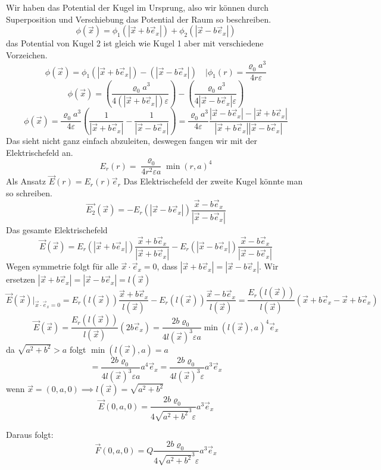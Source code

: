 \documentclass{scrartcl}
\let\*\cdot
\begin{document}
\begin{itemize}
Wir haben das Potential der Kugel im Ursprung, also wir können durch Superposition und Verschiebung das Potential der Raum so beschreiben.
\[\phi(\vec{x})=\phi_1(|\vec{x}+b \vec{e}_x|)+\phi_2(|\vec{x}-b \vec{e}_x|)\]
das Potential von Kugel 2 ist gleich wie Kugel 1 aber mit verschiedene Vorzeichen.
\[\phi(\vec{x})=\phi_1(|\vec{x}+b \vec{e}_x|)-(|\vec{x}-b \vec{e}_x|)\quad | \phi_1(r)=\frac{\varrho_0 a^3}{4 r \varepsilon}\]
\[\phi(\vec{x})=\left(\frac{\varrho_0 a^3}{4 (|\vec{x}+b \vec{e}_x|)\varepsilon}\right)-\left(\frac{\varrho_0 a^3}{4|\vec{x}-b \vec{e}_x| \varepsilon}\right)\]
\[\phi(\vec{x})=\frac{\varrho_0 a^3}{4\varepsilon}\left(\frac{1}{ |\vec{x}+b \vec{e}_x|}-\frac{1}{|\vec{x}-b \vec{e}_x|}\right)
=\frac{\varrho_0 a^3}{4\varepsilon}\frac{|\vec{x}-b \vec{e}_x|- |\vec{x}+b \vec{e}_x|}{ |\vec{x}+b \vec{e}_x| |\vec{x}-b \vec{e}_x|}\]
Das sieht nicht ganz einfach abzuleiten, deswegen fangen wir mit der Elektrischefeld an.
\[ E_r(r)  =\frac{\varrho_0}{4 r^2 \varepsilon a} {\min(r,a)}^4 \]
Als Ansatz $\vec{E}(r)=E_r(r)\vec{e}_r$
Das Elektrischefeld der zweite Kugel könnte man so schreiben.
\[ \vec{E_2}(\vec{x})  =-E_r(|\vec{x}-b\vec{e}_x|)\frac{\vec{x}-b\vec{e}_x}{|\vec{x}-b\vec{e}_x|}\]
Das gesamte Elektrischefeld
\[ \vec{E}(\vec{x})  =E_r(|\vec{x}+b\vec{e}_x|)\frac{\vec{x}+b\vec{e}_x}{|\vec{x}+b\vec{e}_x|}-E_r(|\vec{x}-b\vec{e}_x|)\frac{\vec{x}-b\vec{e}_x}{|\vec{x}-b\vec{e}_x|}\]
Wegen symmetrie folgt für alle $\vec{x}\*\vec{e}_x= 0$, dass $|\vec{x}+b \vec{e}_x|=|\vec{x}-b \vec{e}_x|$.
Wir ersetzen  $|\vec{x}+b \vec{e}_x|=|\vec{x}-b \vec{e}_x|=l(\vec{x})$
\[ \vec{E}(\vec{x})|_{\vec{x}\*\vec{e}_x= 0}  =E_r(l(\vec{x}))\frac{\vec{x}+b\vec{e}_x}{l(\vec{x})}-E_r(l(\vec{x}))\frac{\vec{x}-b\vec{e}_x}{l(\vec{x})}
=\frac{E_r(l(\vec{x}))}{l(\vec{x})}
\left(\vec{x}+b\vec{e}_x-\vec{x}+b\vec{e}_x\right)\]
\[ \vec{E}(\vec{x}) =\frac{E_r(l(\vec{x}))}{l(\vec{x})}
\left(2b\vec{e}_x\right)
=\frac{2b \varrho_0}{4 {l(\vec{x})}^3 \varepsilon a} {\min(l(\vec{x}),a)}^4\vec{e}_x\]
da $\sqrt{a^2+b^2}>a$ folgt $\min(l(\vec{x}),a)=a$
\[=\frac{2b \varrho_0}{4 {l(\vec{x})}^3 \varepsilon a} a^4\vec{e}_x
=\frac{2b \varrho_0}{4 {l(\vec{x})}^3 \varepsilon } a^3 \vec{e}_x\]
wenn $\vec{x}=(0,a,0)\implies l(\vec{x})=\sqrt{a^2+b^2}$
\[ \vec{E}(0,a,0) 
=\frac{2b \varrho_0}{4 {\sqrt{a^2+b^2}}^3 \varepsilon } a^3 \vec{e}_x\]

Daraus folgt:
\[ \vec{F}(0,a,0) 
=Q \frac{2b \varrho_0}{4 {\sqrt{a^2+b^2}}^3 \varepsilon } a^3 \vec{e}_x\]
\end{itemize}
\end{document}
